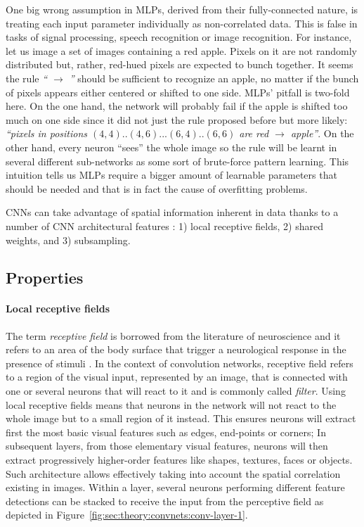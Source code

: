 One big wrong assumption in MLPs, derived from their fully-connected nature, is treating each input parameter individually as non-correlated data.
This is false in tasks of signal processing, speech recognition or image recognition.
For instance, let us image a set of images containing a red apple.
Pixels on it are not randomly distributed but, rather, red-hued pixels are expected to bunch together.
It seems the rule \emph{`` $\rightarrow$ ''} should be sufficient to recognize an apple, no matter if the bunch of pixels appears either centered or shifted to one side.
MLPs' pitfall is two-fold here.
On the one hand, the network will probably fail if the apple is shifted too much on one side since it did not just the rule proposed before but more likely: \emph{``pixels in positions $(4, 4)..(4, 6)...(6, 4)..(6, 6)$ are red $\rightarrow$ apple''}.
On the other hand, every neuron ``sees'' the whole image so the rule will be learnt in several different sub-networks as some sort of brute-force pattern learning.
This intuition tells us MLPs require a bigger amount of learnable parameters that should be needed and that is in fact the cause of overfitting problems.

CNNs can take advantage of spatial information inherent in data thanks to a number of CNN architectural features \cite{LeCun1998}: 1) local receptive fields, 2) shared weights, and 3) subsampling.


\subsection{Properties}
\label{sub:concepts:convnets:properties}

\paragraph{Local receptive fields}
The term \emph{receptive field} is borrowed from the literature of neuroscience and it refers to an area of the body surface that trigger a neurological response in the presence of stimuli \cite{Sherrington1906,Alonso2008}.
In the context of convolution networks, receptive field refers to a region of the visual input, represented by an image, that is connected with one or several neurons that will react to it and is commonly called \emph{filter}.
Using local receptive fields means that neurons in the network will not react to the whole image but to a small region of it instead.
This ensures neurons will extract first the most basic visual features such as edges, end-points or corners;
In subsequent layers, from those elementary visual features, neurons will then extract progressively higher-order features like shapes, textures, faces or objects.
Such architecture allows effectively taking into account the spatial correlation existing in images.
Within a layer, several neurons performing different feature detections can be stacked to receive the input from the perceptive field as depicted in Figure~\ref{fig:sec:theory:convnets:conv-layer-1}.

